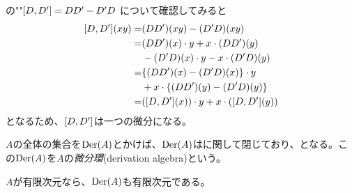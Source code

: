 \documentclass[../main]{subfiles}
\begin{document}
\begin{remark}
  {}の"{}"$\comm{D}{D^\prime}=DD^\prime-D^\prime D$ について確認してみると
  \begin{align*}
    \comm{D}{D^\prime}(xy) =& \qty(DD^\prime)(xy)-\qty(D^\prime D)(xy)\\
    =& \qty(DD^\prime)(x)\cdot y + x\cdot\qty(DD^\prime)(y) \\
    & -\qty(D^\prime D)(x)\cdot y - x\cdot\qty(D^\prime D)(y)\\
    =& \qty{\qty(DD^\prime)(x)-\qty(D^\prime D)(x)}\cdot y\\
    & + x\cdot\qty{\qty(DD^\prime)(y) - \qty(D^\prime D)(y)}\\
    =& \qty(\comm{D}{D^\prime}(x))\cdot y + x\cdot\qty(\comm{D}{D^\prime}(y))
  \end{align*}
  となるため、$\comm{D}{D^\prime}$は一つの微分になる。
\end{remark}

\begin{definition}[微分環]\label{Def:der_alg}
  $A$の{}全体の集合を$\operatorname{Der}(A)$とかけば、$\operatorname{Der}(A)$は{}に関して閉じており、{}となる。この$\operatorname{Der}(A)$を$A$の\emph{微分環}(derivation algebra)という。
\end{definition}

\begin{remark}
  $A$が有限次元なら、\href{Def:der_alg}{$\operatorname{Der}(A)$}も有限次元である。
\end{remark}
\end{document}
